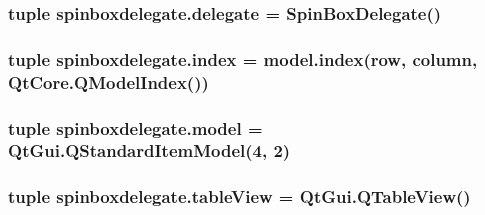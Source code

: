\subsubsection[{delegate}]{\setlength{\rightskip}{0pt plus 5cm}tuple spinboxdelegate.\+delegate = {\bf Spin\+Box\+Delegate}()}\label{namespacespinboxdelegate_affde55843ab83bd8f4f72a54939f4d1b}
\hypertarget{namespacespinboxdelegate_ad25af901d52d3bd30deae4afa444a3b6}{}
\subsubsection[{index}]{\setlength{\rightskip}{0pt plus 5cm}tuple spinboxdelegate.\+index = model.\+index(row, column, Qt\+Core.\+Q\+Model\+Index())}\label{namespacespinboxdelegate_ad25af901d52d3bd30deae4afa444a3b6}
\hypertarget{namespacespinboxdelegate_a3cf773215c38e01b0ef4f7d8502ee7f8}{}
\subsubsection[{model}]{\setlength{\rightskip}{0pt plus 5cm}tuple spinboxdelegate.\+model = Qt\+Gui.\+Q\+Standard\+Item\+Model(4, 2)}\label{namespacespinboxdelegate_a3cf773215c38e01b0ef4f7d8502ee7f8}
\hypertarget{namespacespinboxdelegate_a46d20b9f23aca9d182a616b92ec370e0}{}
\subsubsection[{table\+View}]{\setlength{\rightskip}{0pt plus 5cm}tuple spinboxdelegate.\+table\+View = Qt\+Gui.\+Q\+Table\+View()}\label{namespacespinboxdelegate_a46d20b9f23aca9d182a616b92ec370e0}
